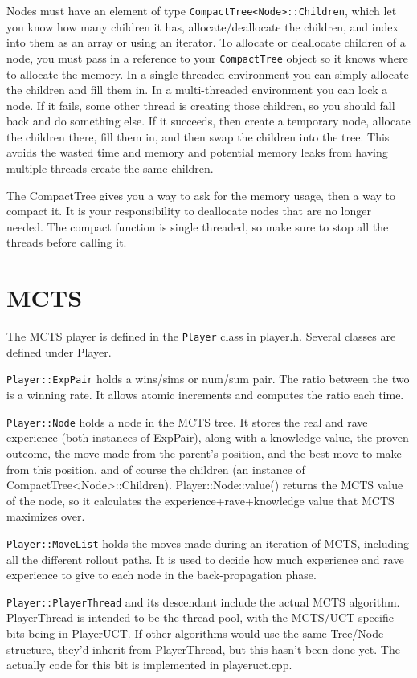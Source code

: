 \documentclass[12pt]{article}          %
\begin{document}
Nodes must have an element of type \texttt{CompactTree<Node>::Children}, which let you know how many children it has, allocate/deallocate the children, and index into them as an array or using an iterator. To allocate or deallocate children of a node, you must pass in a reference to your \texttt{CompactTree} object so it knows where to allocate the memory. In a single threaded environment you can simply allocate the children and fill them in. In a multi-threaded environment you can lock a node. If it fails, some other thread is creating those children, so you should fall back and do something else. If it succeeds, then create a temporary node, allocate the children there, fill them in, and then swap the children into the tree. This avoids the wasted time and memory and potential memory leaks from having multiple threads create the same children.

The CompactTree gives you a way to ask for the memory usage, then a way to compact it. It is your responsibility to deallocate nodes that are no longer needed. The compact function is single threaded, so make sure to stop all the threads before calling it.


\section{MCTS}

The MCTS player is defined in the \texttt{Player} class in player.h. Several classes are defined under Player.

\texttt{Player::ExpPair} holds a wins/sims or num/sum pair. The ratio between the two is a winning rate. It allows atomic increments and computes the ratio each time.

\texttt{Player::Node} holds a node in the MCTS tree. It stores the real and rave experience (both instances of ExpPair), along with a knowledge value, the proven outcome, the move made from the parent's position, and the best move to make from this position, and of course the children (an instance of CompactTree<Node>::Children). Player::Node::value() returns the MCTS value of the node, so it calculates the experience+rave+knowledge value that MCTS maximizes over.

\texttt{Player::MoveList} holds the moves made during an iteration of MCTS, including all the different rollout paths. It is used to decide how much experience and rave experience to give to each node in the back-propagation phase.

\texttt{Player::PlayerThread} and its descendant  include the actual MCTS algorithm. PlayerThread is intended to be the thread pool, with the MCTS/UCT specific bits being in PlayerUCT. If other algorithms would use the same Tree/Node structure, they'd inherit from PlayerThread, but this hasn't been done yet. The actually code for this bit is implemented in playeruct.cpp.
\end{document}

